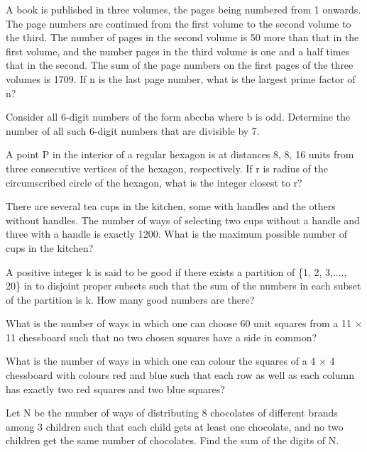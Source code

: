 \item A book is published in three volumes, the pages being numbered from 1 onwards. The page numbers are continued from the first volume to the second volume to the third. The number of pages in the second volume is 50 more than that in the first volume, and the number pages in the third volume is one and a half times that in the second. The sum of the page numbers on the first pages of the three volumes is 1709. If n is the last page number, what is the largest prime factor of n?

\item Consider all 6-digit numbers of the form abccba where b is odd. Determine the number of all such 6-digit numbers that are divisible by 7.

\item A point P in the interior of a regular hexagon is at distances 8, 8, 16 units from three consecutive vertices of the hexagon, respectively. If r is radius of the circumscribed circle of the hexagon, what is the integer closest to r?

\item There are several tea cups in the kitchen, some with handles and the others without handles. The number of ways of selecting two cups without a handle and three with a handle is exactly 1200. What is the maximum possible number of cups in the kitchen?

\item A positive integer k is said to be good if there exists a partition of \{1, 2, 3,...., 20\} in to disjoint proper subsets such that the sum of the numbers in each subset of the partition is k.
How many good numbers are there?

\item What is the number of ways in which one can choose 60 unit squares from a 11 $\times$ 11 chessboard such that no two chosen squares have a side in common?

\item What is the number of ways in which one can colour the squares of a 4 $\times$ 4 chessboard with colours red and blue such that each row as well as each column has exactly two red squares and two blue squares?

\item Let N be the number of ways of distributing 8 chocolates of different brands among 3 children such that each child gets at least one chocolate, and no two children get the same number of chocolates. Find the sum of the digits of N.

